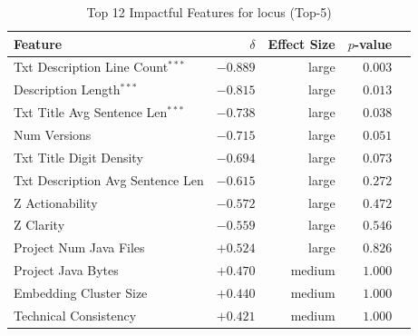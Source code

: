 \begin{table}[h]
\centering
\caption{Top 12 Impactful Features for locus (Top-5)}
\label{tab:tool_features_locus_top5}
\begin{tabular}{lrrrr}
\toprule
Feature & $\delta$ & Effect Size & $p$-value \\
\midrule
Txt Description Line Count$^{***}$ & $-0.889$ & large & $0.003$ \\
Description Length$^{***}$ & $-0.815$ & large & $0.013$ \\
Txt Title Avg Sentence Len$^{***}$ & $-0.738$ & large & $0.038$ \\
Num Versions & $-0.715$ & large & $0.051$ \\
Txt Title Digit Density & $-0.694$ & large & $0.073$ \\
Txt Description Avg Sentence Len & $-0.615$ & large & $0.272$ \\
Z Actionability & $-0.572$ & large & $0.472$ \\
Z Clarity & $-0.559$ & large & $0.546$ \\
Project Num Java Files & $+0.524$ & large & $0.826$ \\
Project Java Bytes & $+0.470$ & medium & $1.000$ \\
Embedding Cluster Size & $+0.440$ & medium & $1.000$ \\
Technical Consistency & $+0.421$ & medium & $1.000$ \\
\bottomrule
\end{tabular}
\end{table}
